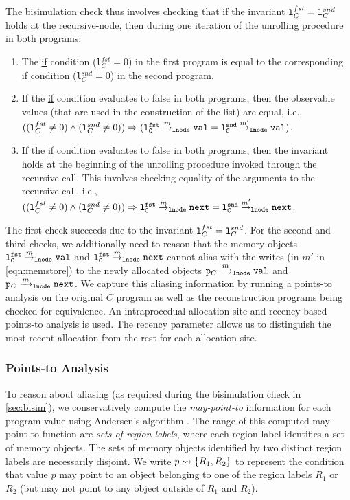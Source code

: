 The bisimulation check thus involves checking that
if the invariant
${\tt l}^{fst}_C={\tt l}^{snd}_C$
holds at the recursive-node,
then during one iteration of the unrolling procedure
in both programs:
\begin{enumerate}
\item The \underline{if} condition
({\tt l$^{fst}_C=0$}) in the first program
is equal to the corresponding \underline{if}
condition ({\tt l$^{snd}_C=0$}) in the
second program.
\item If the \underline{if} condition
evaluates to false in both programs, then
the observable values (that are used in the
construction of the list) are equal, i.e.,
$(({\tt l}^{fst}_C\neq 0)\land({\tt l}^{snd}_C\neq 0))\Rightarrow ({\tt {\tt l}^{fst}_C} \overset{m}{\rightarrow}_{\tt lnode} {\tt val}=
{\tt {\tt l}^{snd}_C} \overset{m'}{\rightarrow}_{\tt lnode} {\tt val})$.
\item If the \underline{if} condition
evaluates to false in both programs, then
the invariant holds at the beginning
of the unrolling procedure invoked through the
recursive call.
This involves checking equality
of the arguments to the recursive call, i.e.,
$(({\tt l}^{fst}_C\neq 0)\land({\tt l}^{snd}_C\neq 0))\Rightarrow {\tt {\tt l}^{fst}_C} \overset{m}{\rightarrow}_{\tt lnode} {\tt next}
=
{\tt {\tt l}^{snd}_C} \overset{m'}{\rightarrow}_{\tt lnode} {\tt next}$.
\end{enumerate}
The first check succeeds due to the invariant
${\tt l}^{fst}_C={\tt l}^{snd}_C$.
For the second and third checks, we additionally
need to reason that the memory objects
${\tt {\tt l}^{fst}_C} \overset{m}{\rightarrow}_{\tt lnode} {\tt val}$ and
${\tt {\tt l}^{fst}_C} \overset{m}{\rightarrow}_{\tt lnode} {\tt next}$ cannot
alias with the writes (in $m'$ in \cref{eqn:memstore})
to the newly allocated objects
${\tt p}_C\xrightarrow[]{m}_{\mathrm{\tt lnode}}{\tt val}$
and
${\tt p}_C\xrightarrow[]{m}_{\mathrm{\tt lnode}}{\tt next}$.
We capture this aliasing information by running a points-to analysis on
the original $C$ program as well as the reconstruction programs being checked
for equivalence. An intraprocedual allocation-site and recency based points-to analysis is used.
The recency parameter allows us to distinguish the most recent allocation from the rest for
each allocation site.

\subsubsection{Points-to Analysis}
\label{sec:pointsTo}
To reason about aliasing (as required during the bisimulation
check in \cref{sec:bisim}), we conservatively compute the
{\em may-point-to}
information for each program value using Andersen's algorithm \cite{andersen94programanalysis}.
The range of this computed
may-point-to function are {\em sets of region labels}, where
each region label identifies a set of memory objects.
The sets of memory objects identified by two distinct region
labels are necessarily disjoint. We write $p\rightsquigarrow\{R_1,R_2\}$
to represent the condition that value $p$ may point to
an object belonging to one of the region labels $R_1$ or $R_2$ (but
may not point to any object outside of $R_1$ and $R_2$).


